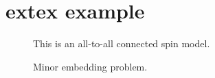 \documentclass{article}
\begin{document}
\section{extex example}

\lipsum[1-3]



\lipsum[4-5]

\begin{figure}
    \centering
    
    \caption{This is an all-to-all connected spin model.}
\end{figure}

\lipsum[6-7]

\begin{figure}
    \centering
    
    \caption{Minor embedding problem.}
\end{figure}

\lipsum[8-10]
\end{document}
